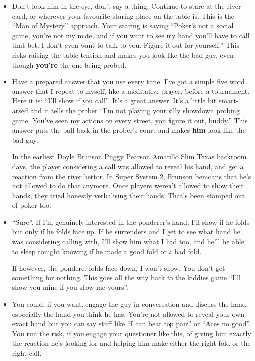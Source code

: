 \begin{itemize}
  \item Don't look him in the eye, don't say a thing. Continue to
    stare at the river card, or wherever your favourite staring place
    on the table is. This is the ``Man of Mystery'' approach. Your
    staring is saying ``Poker's not a social game, you're not my
    mate, and if you want to see my hand you'll have to call that
    bet. I don't even want to talk to you. Figure it out for
    yourself.'' This risks raising the table tension and makes you
    look like the bad guy, even though \textbf{you're} the one being
    probed.

  \item Have a prepared answer that you use every time. I've got a
    simple five word answer that I repeat to myself, like a meditative
    prayer, before a tournament. Here it is: ``I'll show if you
    call''. It's a great answer. It's a little bit smart-arsed and it
    tells the prober ``I'm not playing your silly showdown probing
    game. You've seen my actions on every street, you figure it out,
    buddy.'' This answer puts the ball back in the prober's court and
    makes \textbf{him} look like the bad guy.

  In the earliest Doyle Brunson Puggy Pearson Amarillo Slim Texas
  backroom days, the player considering a call was allowed to reveal
  his hand, and get a reaction from the river bettor. In Super System
  2, Brunson bemoans that he's not allowed to do that anymore.
  Once players weren't allowed to show their hands, they tried
  honestly verbalising their hands. That's been stamped out of poker
  too.

  \item ``Sure''. If I'm genuinely interested in the ponderer's hand,
    I'll show if he folds but only if he folds face up. If he
    surrenders and I get to see what hand he was considering calling
    with, I'll show him what I had too, and he'll be able to sleep
    tonight knowing if he made a good fold or a bad fold.

    If however, the ponderer folds face down, I won't show. You don't
    get something for nothing. This goes all the way back to the
    kiddies game ``I'll show you mine if you show me yours''.

  \item You could, if you want, engage the guy in conversation and
    discuss the hand, especially the hand you think he has. You're not
    allowed to reveal your own exact hand but you can say stuff like
    ``I can beat top pair'' or ``Aces no good''. You run the risk, if
    you engage your questioner like this, of giving him exactly the
    reaction he's looking for and helping him make either the right
    fold or the right call.


\end{itemize}
